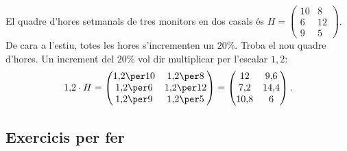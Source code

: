\begin{exresolt}
El quadre d'hores setmanals de tres monitors en dos casals és
$H=\begin{pmatrix} 10 & 8 \\ 6 & 12 \\ 9 & 5 \end{pmatrix}$.
De cara a l'estiu, totes les hores s'incrementen un $20\%$. Troba el nou quadre d'hores.
\solucio
Un increment del $20\%$ vol dir multiplicar per l'escalar $1{,}2$:
\[
1{,}2\cdot H=\begin{pmatrix} 1{,}2\per 10 & 1{,}2\per 8 \\ 1{,}2\per 6 & 1{,}2\per 12 \\ 1{,}2\per 9 & 1{,}2\per 5 \end{pmatrix}
            =\begin{pmatrix} 12 & 9{,}6 \\ 7{,}2 & 14{,}4 \\ 10{,}8 & 6 \end{pmatrix}.
\]
\end{exresolt}

\subsection{Exercicis per fer}

